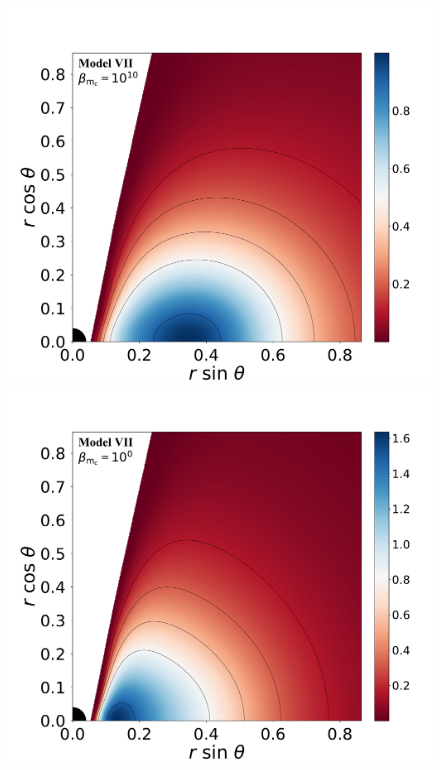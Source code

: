 \documentclass[twocolumn,aps,showpacs,showkeys,prd,superscriptaddress,byrevtex, amsmath]{revtex4-1}
\begin{document}
\begin{figure}
\includegraphics[scale=0.14]{figures/fig2_VII_10.pdf}
\hspace{-0.3cm}
\includegraphics[scale=0.14]{figures/fig2_VII_1.pdf}
\hspace{-0.2cm}

\end{figure}
\end{document}
